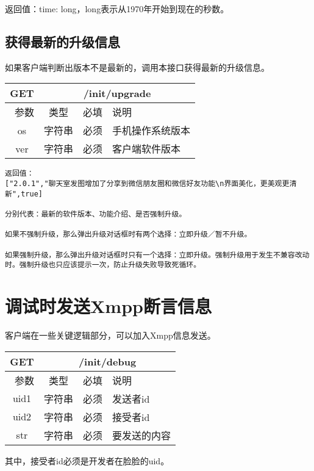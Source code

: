 \documentclass[cs4size]{ctexartutf8}
\begin{document}
返回值：{time: long}，long表示从1970年开始到现在的秒数。


\subsection{获得最新的升级信息}

如果客户端判断出版本不是最新的，调用本接口获得最新的升级信息。
\begin{table}[H]
   \begin{center}
\begin{tabular}{|c|c|c|p{12cm}|}
\hline
GET & \multicolumn{3}{|c|}{/init/upgrade} \\
\hline\hline
 \  参数  & 类型 & 必填 &  说明  \\
 \hline
 os  & 字符串 & 必须 &  手机操作系统版本\\
 \hline
 ver  & 字符串 & 必须 &  客户端软件版本\\
\hline
\end{tabular}
   \end{center}
\end{table}

\begin{verbatim}
返回值：
["2.0.1","聊天室发图增加了分享到微信朋友圈和微信好友功能\n界面美化，更美观更清新",true]

分别代表：最新的软件版本、功能介绍、是否强制升级。

如果不强制升级，那么弹出升级对话框时有两个选择：立即升级／暂不升级。

如果强制升级，那么弹出升级对话框时只有一个选择：立即升级。强制升级用于发生不兼容改动时。强制升级也只应该提示一次，防止升级失败导致死循环。
\end{verbatim}



\section{调试时发送Xmpp断言信息}

客户端在一些关键逻辑部分，可以加入Xmpp信息发送。
\begin{table}[H]
   \begin{center}
\begin{tabular}{|c|c|c|p{12cm}|}
\hline
GET & \multicolumn{3}{|c|}{/init/debug} \\
\hline\hline
 \  参数  & 类型 & 必填 &  说明  \\
 \hline
 uid1  & 字符串 & 必须 &  发送者id\\
 \hline
 uid2  & 字符串 & 必须 &  接受者id\\ 
 \hline
 str  & 字符串 & 必须 &  要发送的内容\\
\hline
\end{tabular}
   \end{center}
\end{table}
其中，接受者id必须是开发者在脸脸的uid。
\end{document}
